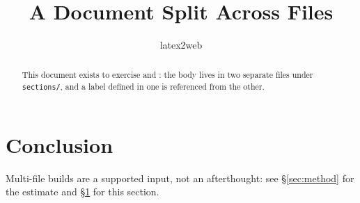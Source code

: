 \documentclass{article}
\title{A Document Split Across Files}
\author{latex2web}
\date{}
\begin{document}
\maketitle

\begin{abstract}
This document exists to exercise \verb|| and \verb||: the body
lives in two separate files under \texttt{sections/}, and a label defined in
one is referenced from the other.
\end{abstract}




\section{Conclusion}\label{sec:conclusion}
Multi-file builds are a supported input, not an afterthought: see
\S\ref{sec:method} for the estimate and \S\ref{sec:conclusion} for this section.
\end{document}
